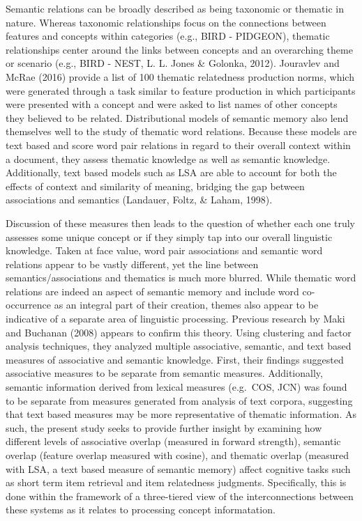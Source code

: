 \documentclass[english,man]{apa6}
\theoremstyle{definition}
\theoremstyle{definition}
\theoremstyle{remark}
\begin{document}
Semantic relations can be broadly described as being taxonomic or
thematic in nature. Whereas taxonomic relationships focus on the
connections between features and concepts within categories (e.g., BIRD
- PIDGEON), thematic relationships center around the links between
concepts and an overarching theme or scenario (e.g., BIRD - NEST, L. L.
Jones \& Golonka, 2012). Jouravlev and McRae (2016) provide a list of
100 thematic relatedness production norms, which were generated through
a task similar to feature production in which participants were
presented with a concept and were asked to list names of other concepts
they believed to be related. Distributional models of semantic memory
also lend themselves well to the study of thematic word relations.
Because these models are text based and score word pair relations in
regard to their overall context within a document, they assess thematic
knowledge as well as semantic knowledge. Additionally, text based models
such as LSA are able to account for both the effects of context and
similarity of meaning, bridging the gap between associations and
semantics (Landauer, Foltz, \& Laham, 1998).

Discussion of these measures then leads to the question of whether each
one truly assesses some unique concept or if they simply tap into our
overall linguistic knowledge. Taken at face value, word pair
associations and semantic word relations appear to be vastly different,
yet the line between semantics/associations and thematics is much more
blurred. While thematic word relations are indeed an aspect of semantic
memory and include word co-occurrence as an integral part of their
creation, themes also appear to be indicative of a separate area of
linguistic processing. Previous research by Maki and Buchanan (2008)
appears to confirm this theory. Using clustering and factor analysis
techniques, they analyzed multiple associative, semantic, and text based
measures of associative and semantic knowledge. First, their findings
suggested associative measures to be separate from semantic measures.
Additionally, semantic information derived from lexical measures
(e.g.~COS, JCN) was found to be separate from measures generated from
analysis of text corpora, suggesting that text based measures may be
more representative of thematic information. As such, the present study
seeks to provide further insight by examining how different levels of
associative overlap (measured in forward strength), semantic overlap
(feature overlap measured with cosine), and thematic overlap (measured
with LSA, a text based measure of semantic memory) affect cognitive
tasks such as short term item retrieval and item relatedness judgments.
Specifically, this is done within the framework of a three-tiered view
of the interconnections between these systems as it relates to
processing concept informatation.
\end{document}
